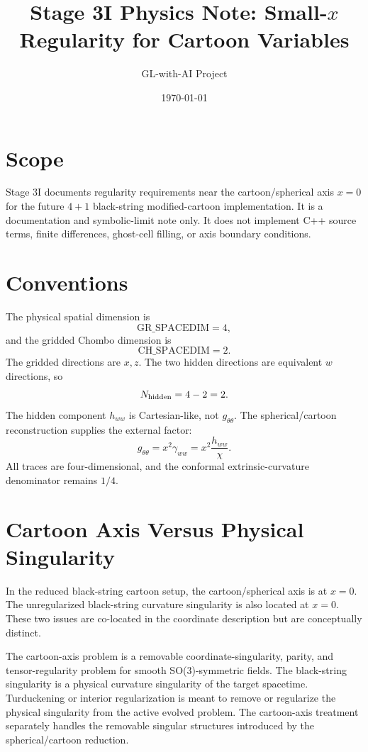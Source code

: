\documentclass[11pt]{article}
\title{Stage 3I Physics Note: Small-\(x\) Regularity for Cartoon Variables}
\author{GL-with-AI Project}
\date{\today}
\begin{document}
\maketitle

\section{Scope}

Stage 3I documents regularity requirements near the cartoon/spherical axis
\(x=0\) for the future \(4+1\) black-string modified-cartoon implementation.
It is a documentation and symbolic-limit note only. It does not implement C++
source terms, finite differences, ghost-cell filling, or axis boundary
conditions.

\section{Conventions}

The physical spatial dimension is
\[
  \mathrm{GR\_SPACEDIM}=4,
\]
and the gridded Chombo dimension is
\[
  \mathrm{CH\_SPACEDIM}=2.
\]
The gridded directions are \(x,z\). The two hidden directions are equivalent
\(w\) directions, so
\[
  N_{\rm hidden}=4-2=2.
\]
The hidden component \(h_{ww}\) is Cartesian-like, not \(g_{\theta\theta}\).
The spherical/cartoon reconstruction supplies the external factor:
\[
  g_{\theta\theta}
  =
  x^2\gamma_{ww}
  =
  x^2\frac{h_{ww}}{\chi}.
\]
All traces are four-dimensional, and the conformal extrinsic-curvature
denominator remains \(1/4\).

\section{Cartoon Axis Versus Physical Singularity}

In the reduced black-string cartoon setup, the cartoon/spherical axis is at
\(x=0\). The unregularized black-string curvature singularity is also located
at \(x=0\). These two issues are co-located in the coordinate description but
are conceptually distinct.

The cartoon-axis problem is a removable coordinate-singularity, parity, and
tensor-regularity problem for smooth SO(3)-symmetric fields. The black-string
singularity is a physical curvature singularity of the target spacetime.
Turduckening or interior regularization is meant to remove or regularize the
physical singularity from the active evolved problem. The cartoon-axis
treatment separately handles the removable singular structures introduced by
the spherical/cartoon reduction.
\end{document}
